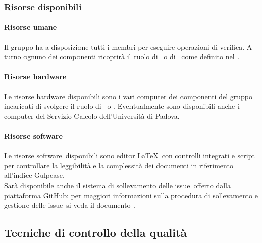 \documentclass[../PianoDiQualifica.tex]{subfiles}
\begin{document}
		    \subsubsection{Risorse disponibili}
			    \paragraph{Risorse umane}
			    Il gruppo ha a disposizione tutti i membri per eseguire operazioni di verifica. A turno ognuno dei componenti ricoprirà il ruolo di \responsabilediprogetto\ o di \verificatore\ come definito nel \pianodiprogettov.
			    \paragraph{Risorse hardware}
			    Le risorse hardware disponibili sono i vari computer dei componenti del gruppo incaricati di svolgere il ruolo di \responsabilediprogetto\ o \verificatore. Eventualmente sono disponibili anche i computer del Servizio Calcolo dell'Università di Padova.
				\paragraph{Risorse software}
				Le risorse software\g\ disponibili sono editor \LaTeX\g\ con controlli integrati e script per controllare la leggibilità e la complessità dei documenti in riferimento all'indice Gulpease\g.\\
				Sarà disponibile anche il sistema di sollevamento delle issue\g\ offerto dalla piattaforma GitHub\g: per maggiori informazioni sulla procedura di sollevamento e gestione delle issue\g\ 
si veda il documento \normediprogettov.
		\subsection{Tecniche di controllo della qualità}
\end{document}
